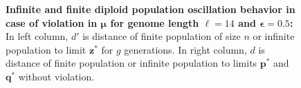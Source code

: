 \begin{figure}[h]
\begin{center}
\hspace{-3em}%
\vspace{-0.5em}  \hspace{-3em}%


\caption[\textbf{Infinite and finite diploid population oscillation behavior in case of violation in $\bm{\mu}$ for genome length $\ell = 14$ and $\bm{\epsilon} = 0.5$}]{\textbf{Infinite and finite diploid population oscillation behavior in case of violation in $\bm{\mu}$ for genome length $\ell = 14$ and $\bm{\epsilon} = 0.5$:} 
  In left column, $d'$ is distance of finite population of size $n$ or infinite population to limit $\bm{z}^\ast$ for $g$ generations. In right column, $d$ is distance of finite population or infinite population to limits $\bm{p}^\ast$ and $\bm{q}^\ast$ without violation.}
\label{oscillation_14d_vio_mu_0.5}
\end{center}
\end{figure}

